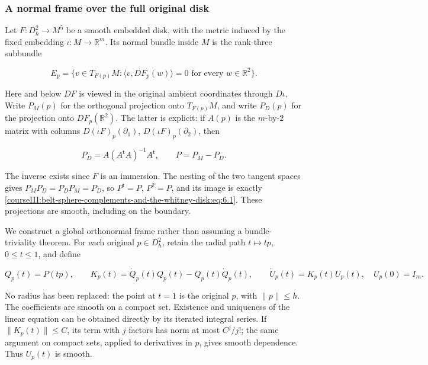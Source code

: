 \subsubsection{A normal frame over the full original disk}
\label{courseIII:belt-sphere-complements-and-the-whitney-disk:section-6.1}

Let \(F:D_h^2\to M^5\) be a smooth embedded disk, with the metric induced by the fixed embedding \(\iota:M\to\mathbb R^m\). Its normal bundle inside \(M\) is the rank-three subbundle

\begin{equation}
E_p=\{v\in T_{F(p)}M:
 \langle v,DF_p(w)\rangle=0\text{ for every }w\in\mathbb R^2\}.
\label{courseIII:belt-sphere-complements-and-the-whitney-disk:eq:6.1}
\end{equation}

Here and below \(DF\) is viewed in the original ambient coordinates through \(D\iota\). Write \(P_M(p)\) for the orthogonal projection onto \(T_{F(p)}M\), and write \(P_D(p)\) for the projection onto \(DF_p(\mathbb R^2)\). The latter is explicit: if \(A(p)\) is the \(m\)-by-\(2\) matrix with columns \(D(\iota F)_p(\partial_1)\), \(D(\iota F)_p(\partial_2)\), then

\begin{equation}
P_D=A(A^{\mathsf t}A)^{-1}A^{\mathsf t},
\qquad P=P_M-P_D.
\label{courseIII:belt-sphere-complements-and-the-whitney-disk:eq:6.2}
\end{equation}

The inverse exists since \(F\) is an immersion. The nesting of the two tangent spaces gives
\(P_MP_D=P_DP_M=P_D\), so \(P^{\mathsf t}=P\), \(P^2=P\), and its image is exactly \eqref{courseIII:belt-sphere-complements-and-the-whitney-disk:eq:6.1}. These projections are smooth, including on the boundary.

We construct a global orthonormal frame rather than assuming a bundle-triviality theorem. For each original \(p\in D_h^2\), retain the radial path \(t\mapsto tp\), \(0\leq t\leq1\), and define

\begin{equation}
Q_p(t)=P(tp),\qquad
K_p(t)=\dot Q_p(t)Q_p(t)-Q_p(t)\dot Q_p(t),\qquad
\dot U_p(t)=K_p(t)U_p(t),\quad U_p(0)=I_m.
\label{courseIII:belt-sphere-complements-and-the-whitney-disk:eq:6.3}
\end{equation}

No radius has been replaced: the point at \(t=1\) is the original \(p\), with \(\|p\|\leq h\). The coefficients are smooth on a compact set. Existence and uniqueness of the linear equation can be obtained directly by its iterated integral series. If \(\|K_p(t)\|\leq C\), its term with \(j\) factors has norm at most \(C^j/j!\); the same argument on compact sets, applied to derivatives in \(p\), gives smooth dependence. Thus \(U_p(t)\) is smooth.

